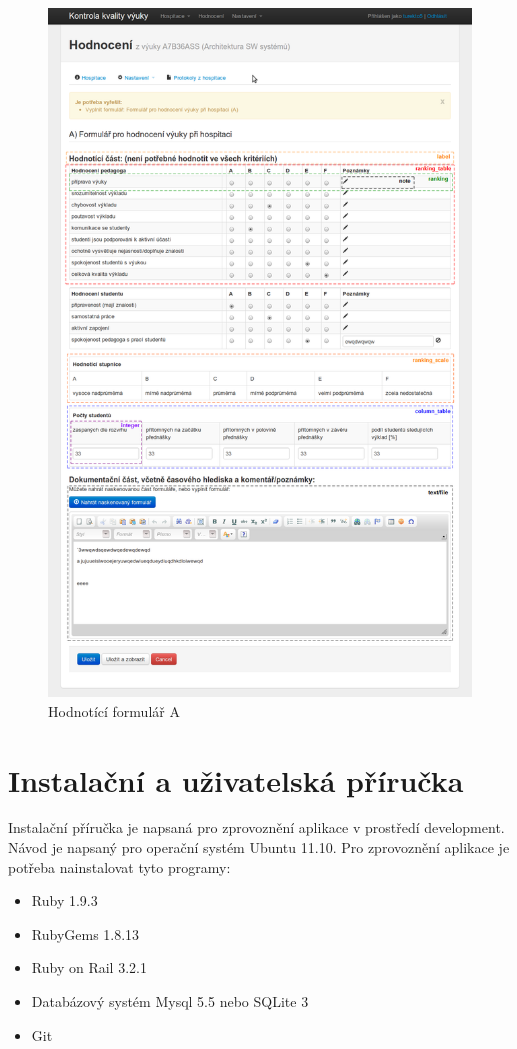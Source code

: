 \begin{figure}[H]
\begin{center}
\includegraphics[width=14cm]{figures/form_A}
\caption{Hodnotící formulář A}
\label{fig:form_a}
\end{center}
\end{figure}

\chapter{Instalační a uživatelská příručka}
Instalační příručka je napsaná pro zprovoznění aplikace v prostředí development. Návod je napsaný pro operační systém Ubuntu 11.10. Pro zprovoznění aplikace je potřeba nainstalovat tyto programy:
\begin{itemize}
\item Ruby 1.9.3
\item RubyGems 1.8.13
\item Ruby on Rail 3.2.1
\item Databázový systém Mysql 5.5 nebo SQLite 3
\item Git
\end{itemize}

